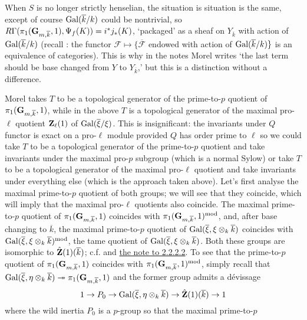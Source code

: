 \documentclass[deligne.tex]{subfiles}
\begin{document}
When $S$ is no longer strictly henselian, the situation is situation is the
same, except of course $\operatorname{Gal}(\overline k/k)$ could be nontrivial, so
$R\Gamma(\pi_1(\mathbf{G}_{m,\overline k},1),\Psi_f(K))=i^*j_*(K)$, `packaged' as
a sheaf on $Y_{\overline k}$ with action of $\operatorname{Gal}(\overline k/k)$
(recall \cite[XIII 1.1.3]{SGA7}: the functor
$\mathcal F\mapsto\{\overline{\mathcal F}$ endowed with action of
$\operatorname{Gal}(\overline k/k)\}$ is an equivalence of categories).
This is why in the notes Morel writes `the last term should be base changed
from $Y$ to $Y_{\overline k}$,' but this is a distinction without a
difference.

Morel takes $T$ to be a topological generator of the prime-to-$p$
quotient of $\pi_1(\mathbf{G}_{m,\overline k},1)$, while in the above $T$ is a
topological generator of the maximal pro-$\ell$ quotient $\mathbf{Z}_\ell(1)$ of
$\operatorname{Gal}(\overline\xi/\xi)$.
This is insignificant: the invariants under $Q$ functor is exact on a
pro-$\ell$ module provided $Q$ has order prime to $\ell$ so we could take
$T$ to be a topological generator of the prime-to-$p$ quotient and take
invariants under the maximal pro-$p$ subgroup (which is a normal Sylow)
or take $T$ to be a topological generator of the maximal pro-$\ell$ quotient
and take invariants under everything else (which is the approach taken 
above).
Let's first analyse the maximal prime-to-$p$ quotient of both groups; we
will see that they coincide, which will imply that the maximal pro-$\ell$
quotients also coincide.
The maximal prime-to-$p$ quotient of $\pi_1(\mathbf{G}_{m,\overline k},1)$
coincides with $\pi_1(\mathbf{G}_{m,\overline k},1)^{\text{mod}}$,
and, after base changing to $\overline k$, the maximal prime-to-$p$ quotient
of $\operatorname{Gal}(\overline\xi,\xi\otimes_k\overline k)$ coincides with
$\operatorname{Gal}(\overline\xi,\xi\otimes_k\overline k)^{\text{mod}}$, the tame quotient
of $\operatorname{Gal}(\overline\xi,\xi\otimes_k\overline k)$. Both these groups are
isomorphic to $\hat{\mathbf{Z}}(1)(\overline k)$; c.f. \cite[2.2.2.1]{Laumon} and
\hyperref[laumon:2.2.2.2]{the note to 2.2.2.2}.
To see that the prime-to-$p$ quotient of $\pi_1(\mathbf{G}_{m,\overline k},1)$
coincides with $\pi_1(\mathbf{G}_{m,\overline k},1)^{\text{mod}}$, simply recall
that $\operatorname{Gal}(\overline\xi,\eta\otimes_k\overline k)\twoheadrightarrow\pi_1(\mathbf{G}_{m,\overline k},1)$
and the former group admits a dévissage
\begin{equation*}
	1\rightarrow P_0\rightarrow\operatorname{Gal}(\overline\xi,\eta\otimes_k\overline k)\rightarrow\hat{\mathbf{Z}}(1)(\overline k)\rightarrow1
\end{equation*}
where the wild inertia $P_0$ is a $p$-group so that the maximal prime-to-$p$ 
\end{document}
